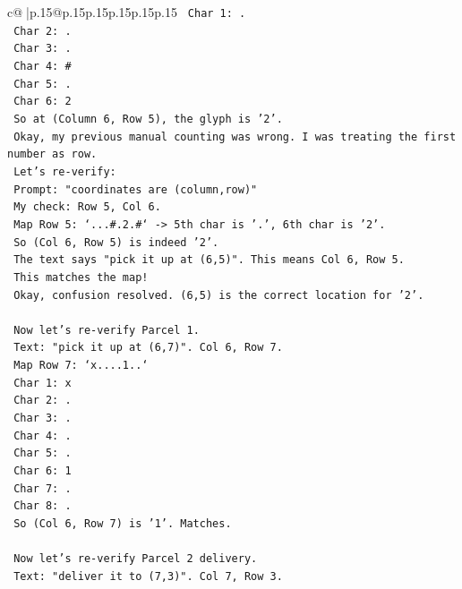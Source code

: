 \documentclass{article}
\begin{document}
{\begin{supertabular}{c@{$\;$}|p{.15\linewidth}@{}p{.15\linewidth}p{.15\linewidth}p{.15\linewidth}p{.15\linewidth}p{.15\linewidth}}
{{{\texttt{       Char 1: .} \\
\texttt{       Char 2: .} \\
\texttt{       Char 3: .} \\
\texttt{       Char 4: \#} \\
\texttt{       Char 5: .} \\
\texttt{       Char 6: 2} \\
\texttt{       So at (Column 6, Row 5), the glyph is '2'.} \\
\texttt{       Okay, my previous manual counting was wrong. I was treating the first number as row.} \\
\texttt{       Let's re{-}verify:} \\
\texttt{       Prompt: "coordinates are (column,row)"} \\
\texttt{       My check: Row 5, Col 6.} \\
\texttt{       Map Row 5: `...\#.2.\#` {-}> 5th char is '.', 6th char is '2'.} \\
\texttt{       So (Col 6, Row 5) is indeed '2'.} \\
\texttt{       The text says "pick it up at (6,5)". This means Col 6, Row 5.} \\
\texttt{       This matches the map!} \\
\texttt{       Okay, confusion resolved. (6,5) is the correct location for '2'.} \\
\\ 
\texttt{       Now let's re{-}verify Parcel 1.} \\
\texttt{       Text: "pick it up at (6,7)". Col 6, Row 7.} \\
\texttt{       Map Row 7: `x....1..`} \\
\texttt{       Char 1: x} \\
\texttt{       Char 2: .} \\
\texttt{       Char 3: .} \\
\texttt{       Char 4: .} \\
\texttt{       Char 5: .} \\
\texttt{       Char 6: 1} \\
\texttt{       Char 7: .} \\
\texttt{       Char 8: .} \\
\texttt{       So (Col 6, Row 7) is '1'. Matches.} \\
\\ 
\texttt{       Now let's re{-}verify Parcel 2 delivery.} \\
\texttt{       Text: "deliver it to (7,3)". Col 7, Row 3.} \\
}}}
\end{supertabular}}
\end{document}
